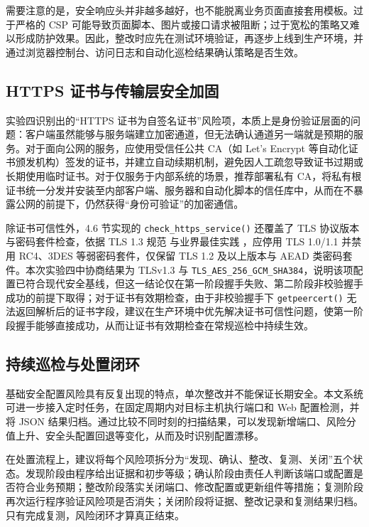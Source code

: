 \documentclass[12pt,a4paper,fontset=none]{ctexart}
\begin{document}
需要注意的是，安全响应头并非越多越好，也不能脱离业务页面直接套用模板。过于严格的 CSP 可能导致页面脚本、图片或接口请求被阻断；过于宽松的策略又难以形成防护效果。因此，整改时应先在测试环境验证，再逐步上线到生产环境，并通过浏览器控制台、访问日志和自动化巡检结果确认策略是否生效。

\subsection{HTTPS 证书与传输层安全加固}

实验四识别出的“HTTPS 证书为自签名证书”风险项，本质上是身份验证层面的问题：客户端虽然能够与服务端建立加密通道，但无法确认通道另一端就是预期的服务。对于面向公网的服务，应使用受信任公共 CA（如 Let's Encrypt 等自动化证书颁发机构）签发的证书，并建立自动续期机制，避免因人工疏忽导致证书过期或长期使用临时证书。对于仅服务于内部系统的场景，推荐部署私有 CA，将私有根证书统一分发并安装至内部客户端、服务器和自动化脚本的信任库中，从而在不暴露公网的前提下，仍然获得“身份可验证”的加密通信。

除证书可信性外，4.6 节实现的 \texttt{check\_https\_service()} 还覆盖了 TLS 协议版本与密码套件检查，依据 TLS 1.3 规范 \cite{rfc8446} 与业界最佳实践 \cite{tls-bcp,mozilla-tls}，应停用 TLS 1.0/1.1 并禁用 RC4、3DES 等弱密码套件，仅保留 TLS 1.2 及以上版本与 AEAD 类密码套件。本次实验四中协商结果为 TLSv1.3 与 \texttt{TLS\_AES\_256\_GCM\_SHA384}，说明该项配置已符合现代安全基线，但这一结论仅在第一阶段握手失败、第二阶段非校验握手成功的前提下取得；对于证书有效期检查，由于非校验握手下 \texttt{getpeercert()} 无法返回解析后的证书字段，建议在生产环境中优先解决证书可信性问题，使第一阶段握手能够直接成功，从而让证书有效期检查在常规巡检中持续生效。

\subsection{持续巡检与处置闭环}

基础安全配置风险具有反复出现的特点，单次整改并不能保证长期安全。本文系统可进一步接入定时任务，在固定周期内对目标主机执行端口和 Web 配置检测，并将 JSON 结果归档。通过比较不同时刻的扫描结果，可以发现新增端口、风险分值上升、安全头配置回退等变化，从而及时识别配置漂移。

在处置流程上，建议将每个风险项拆分为“发现、确认、整改、复测、关闭”五个状态。发现阶段由程序给出证据和初步等级；确认阶段由责任人判断该端口或配置是否符合业务预期；整改阶段落实关闭端口、修改配置或更新组件等措施；复测阶段再次运行程序验证风险项是否消失；关闭阶段将证据、整改记录和复测结果归档。只有完成复测，风险闭环才算真正结束。
\end{document}
